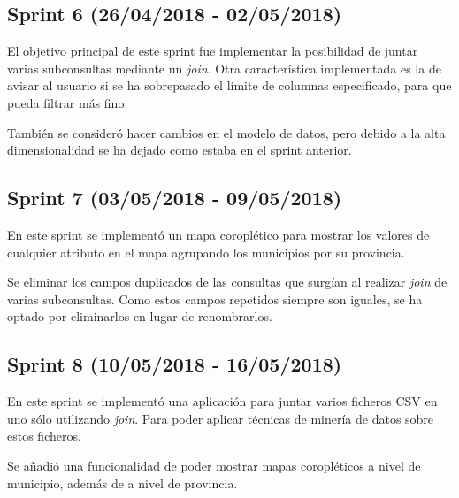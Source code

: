 
\subsection{Sprint 6 (26/04/2018 - 02/05/2018)}

El objetivo principal de este sprint fue implementar la posibilidad de juntar varias subconsultas mediante un \textit{join}. Otra característica implementada es la de avisar al usuario si se ha sobrepasado el límite de columnas especificado, para que pueda filtrar más fino.

También se consideró hacer cambios en el modelo de datos, pero debido a la alta dimensionalidad se ha dejado como estaba en el sprint anterior.



\subsection{Sprint 7 (03/05/2018 - 09/05/2018)}

En este sprint se implementó un mapa coroplético para mostrar los valores de cualquier atributo en el mapa agrupando los municipios por su provincia.

Se eliminar los campos duplicados de las consultas que surgían al realizar \textit{join} de varias subconsultas. Como estos campos repetidos siempre son iguales, se ha optado por eliminarlos en lugar de renombrarlos.



\subsection{Sprint 8 (10/05/2018 - 16/05/2018)}

En este sprint se implementó una aplicación para juntar varios ficheros CSV en uno sólo utilizando \textit{join}. Para poder aplicar técnicas de minería de datos sobre estos ficheros.

Se añadió una funcionalidad de poder mostrar mapas coropléticos a nivel de municipio, además de a nivel de provincia.

